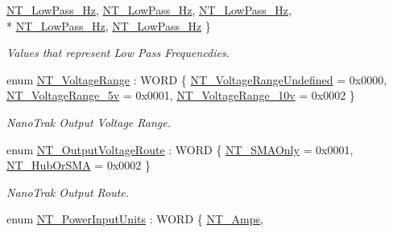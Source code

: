 \begin{DoxyCompactItemize}
\hyperlink{group___common_gga5dcfcfcc977bb4f76ff0b66742371f2aa4317f01690e32de8717a539f9bdddc5f}{N\+T\+\_\+\+Low\+Pass\+\_\+Hz}, 
\hyperlink{group___common_gga5dcfcfcc977bb4f76ff0b66742371f2aa18049eb88b43d0589d44a1ae7aa5e487}{N\+T\+\_\+\+Low\+Pass\+\_\+Hz}, 
\hyperlink{group___common_gga5dcfcfcc977bb4f76ff0b66742371f2aac94dc65dc551f6eb3340985a99f1f884}{N\+T\+\_\+\+Low\+Pass\+\_\+Hz}, 
\\*
\hyperlink{group___common_gga5dcfcfcc977bb4f76ff0b66742371f2aa1e5fa441fe671b8630c79ed6a8b1719a}{N\+T\+\_\+\+Low\+Pass\+\_\+Hz}, 
\hyperlink{group___common_gga5dcfcfcc977bb4f76ff0b66742371f2aa2be41a736bec78822450950f10718dee}{N\+T\+\_\+\+Low\+Pass\+\_\+Hz}
 \}\begin{DoxyCompactList}\small\item\em Values that represent Low Pass Frequencdies. \end{DoxyCompactList}
\item 
enum \hyperlink{group___common_ga4bade700cfdb3b3ac039a82c1df53cf7}{N\+T\+\_\+\+Voltage\+Range} \+: W\+O\+RD \{ \hyperlink{group___common_gga4bade700cfdb3b3ac039a82c1df53cf7a21ce92b0e636c369008cca1325f5239a}{N\+T\+\_\+\+Voltage\+Range\+Undefined} = 0x0000, 
\hyperlink{group___common_gga4bade700cfdb3b3ac039a82c1df53cf7af37a6a3bc53ff2c8cd673974ef0e9255}{N\+T\+\_\+\+Voltage\+Range\+\_\+5v} = 0x0001, 
\hyperlink{group___common_gga4bade700cfdb3b3ac039a82c1df53cf7af84be8d0380f3a747ad39338823ca0f2}{N\+T\+\_\+\+Voltage\+Range\+\_\+10v} = 0x0002
 \}\begin{DoxyCompactList}\small\item\em Nano\+Trak Output Voltage Range. \end{DoxyCompactList}
\item 
enum \hyperlink{group___common_ga4740d0dfe32cadf4e1d23954e95719bd}{N\+T\+\_\+\+Output\+Voltage\+Route} \+: W\+O\+RD \{ \hyperlink{group___common_gga4740d0dfe32cadf4e1d23954e95719bda16fefd3d5ad49b654dcb4a962fbbb9bb}{N\+T\+\_\+\+S\+M\+A\+Only} = 0x0001, 
\hyperlink{group___common_gga4740d0dfe32cadf4e1d23954e95719bda01ebda34c905b0f037cc3d5f7ca49505}{N\+T\+\_\+\+Hub\+Or\+S\+MA} = 0x0002
 \}\begin{DoxyCompactList}\small\item\em Nano\+Trak Output Route. \end{DoxyCompactList}
\item 
enum \hyperlink{group___common_ga019e1d6ab2bfe02c9351c8c5a5a9500e}{N\+T\+\_\+\+Power\+Input\+Units} \+: W\+O\+RD \{ \hyperlink{group___common_gga019e1d6ab2bfe02c9351c8c5a5a9500ea22a06e183a4a079f2a7a84a00024bb63}{N\+T\+\_\+\+Amps}, 

\end{DoxyCompactItemize}
